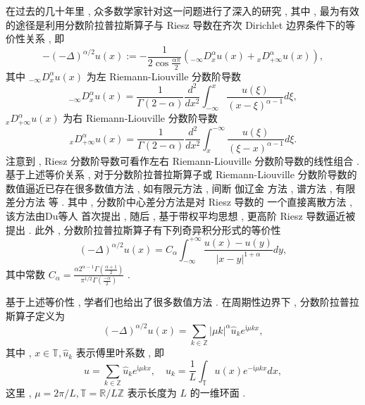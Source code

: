 在过去的几十年里 , 众多数学家针对这一问题进行了深入的研究 , 其中 , 最为有效的途径是利用分数阶拉普拉斯算子与 Riesz 导数在齐次 Dirichlet 边界条件下的等价性关系 \cite{yangNumericalMethodsFractional2010,demengelFunctionalSpacesTheory2012} , 即
\begin{equation}
-(-\Delta)^{\alpha / 2} u(x):=-\frac{1}{2 \cos \frac{\alpha \pi}{2}}\left({ }_{-\infty }D_x^\alpha u(x)+{ }_x D_{+\infty}^\alpha u(x)\right) , 
\end{equation}
其中 ${ }_{-\infty} D_x^\alpha u(x)$ 为左 Riemann-Liouville 分数阶导数
\begin{equation}
{ }_{-\infty} D_x^\alpha u(x)=\frac{1}{\Gamma(2-\alpha)} \frac{d^2}{d x^2} \int_{-\infty}^x \frac{u(\xi)}{(x-\xi)^{\alpha-1}} d \xi , 
\end{equation}
${ }_x D_{+\infty}^\alpha u(x)$ 为右 Riemann-Liouville 分数阶导数
\begin{equation}
{ }_x D_{+\infty}^\alpha u(x)=\frac{1}{\Gamma(2-\alpha)} \frac{d^2}{d x^2} \int^{-\infty}_x \frac{u(\xi)}{(\xi-x)^{\alpha-1}} d \xi  . 
\end{equation}
注意到 , Riesz 分数阶导数可看作左右 Riemann-Liouville 分数阶导数的线性组合 . 
基于上述等价关系 , 对于分数阶拉普拉斯算子或 Riemann-Liouville 分数阶导数的数值逼近已存在很多数值方法 , 如有限元方法 \cite{dengFiniteElementMethod2009,ervinNumericalApproximationTime2007} , 间断 伽辽金 方法 \cite{xuDiscontinuousGalerkinMethod2014} , 谱方法 \cite{zayernouriFractionalSpectralCollocation2014,zengCrankNicolsonADI2014} , 有限差分方法 \cite{chenFourthOrderAccurate2014,meerschaertFiniteDifferenceApproximations2004} 等 . 
其中 , 分数阶中心差分方法是对 Riesz 导数的 一个直接离散方法 , 该方法由Du等人 \cite{duAnalysisApproximationNonlocal2012} 首次提出 , 随后 , 基于带权平均思想 , 更高阶 Riesz 导数逼近被提出 \cite{dingHighorderAlgorithmsRiesz2015,zhangFourthOrderCompactDifference2014} . 
此外 , 分数阶拉普拉斯算子有下列奇异积分形式的等价性 \cite{duAnalysisApproximationNonlocal2012}
\begin{equation}
(-\Delta)^{\alpha / 2} u(x)=C_\alpha \int_{-\infty}^{+\infty} \frac{u(x)-u(y)}{|x-y|^{1+\alpha}} d y , 
\end{equation}
其中常数 $C_\alpha=\frac{\alpha 2^{\alpha-1} \Gamma\left(\frac{\alpha+1}{2}\right)}{\pi^{1 / 2} \Gamma\left(\frac{-\alpha}{2}\right)}$ . 

基于上述等价性 , 学者们也给出了很多数值方法\cite{gaoMeanExitTime2014,huangNumericalMethodsFractional2014} . 在周期性边界下 , 分数阶拉普拉斯算子定义为 \cite{guoFractionalPartialDifferential2015}
\begin{equation}
(-\Delta)^{\alpha / 2} u(x)=\sum_{k \in \mathbb{Z}}|\mu k|^\alpha \hat{u}_k e^{\mathrm{i} \mu k x} , 
\end{equation}
其中 , $x \in \mathbb{T} , \hat{u}_k$ 表示傅里叶系数 , 即
\begin{equation}
u=\sum_{k \in \mathbb{Z}} \hat{u}_k e^{\mathrm{i} \mu k x} , \quad \hat{u}_k=\frac{1}{L} \int_{\mathbb{T}} u(x) e^{-\mathrm{i} \mu k x} d x , 
\end{equation}
这里 , $\mu=2 \pi / L , \mathbb{T}=\mathbb{R} / L \mathbb{Z}$ 表示长度为 $L$ 的一维环面 . 


